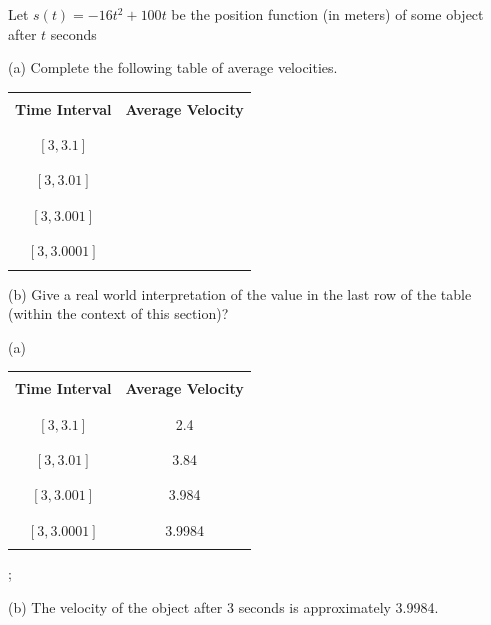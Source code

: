 {Let $s(t) = -16t^2+100t$ be the position function (in meters) of some object after $t$ seconds

(a) Complete the following table of average velocities.
\begin{center}
	\setlength{\extrarowheight}{-0.3cm}
	\begin{tabular}{| c | c |}
		\hline
		&\\
		{\bf Time Interval} & {\bf Average Velocity}\\
		&\\
		\hline
		&\\
		$[3,3.1]$&\\
		&\\
		\hline
		&\\
		$[3,3.01]$&\\
		&\\
		\hline
		&\\
		$[3,3.001]$&\\
		&\\
		\hline
		&\\
		$[3,3.0001]$&\\
		&\\
		\hline
	\end{tabular}
\end{center}
(b) Give a real world interpretation of the value in the last row of the table (within the context of this section)?
}
{
(a)

	\setlength{\extrarowheight}{-0.3cm}
	\begin{tabular}{| c | c |}
		\hline
		&\\
		{\bf Time Interval} & {\bf Average Velocity}\\
		&\\
		\hline
		&\\
		$[3,3.1]$&2.4\\
		&\\
		\hline
		&\\
		$[3,3.01]$&3.84\\
		&\\
		\hline
		&\\
		$[3,3.001]$&3.984\\
		&\\
		\hline
		&\\
		$[3,3.0001]$&3.9984\\
		&\\
		\hline
	\end{tabular};

(b) The velocity of the object after 3 seconds is approximately 3.9984.
}